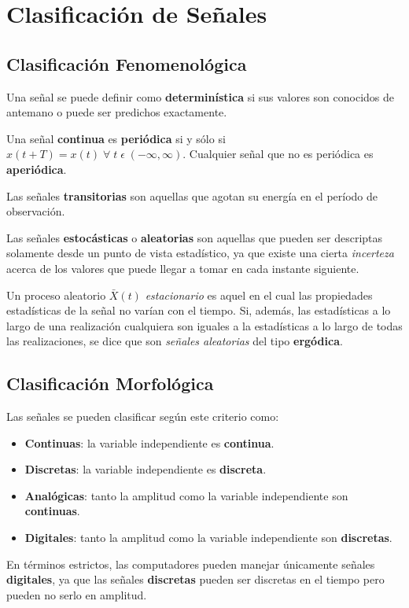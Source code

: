 \documentclass[10pt,a4paper]{book}
\begin{document}
\section{Clasificación de Señales}
\subsection{Clasificación Fenomenológica}

Una señal se puede definir como \textbf{determinística} si sus valores son conocidos de antemano o puede ser predichos exactamente.

Una señal \textbf{continua} es \textbf{periódica} si y sólo si $x(t+T)=x(t) \;\forall \; t\; \epsilon \; (-\infty, \infty)$. Cualquier señal que no es periódica es \textbf{aperiódica}. 

Las señales \textbf{transitorias} son aquellas que agotan su energía en el período de observación.

Las señales \textbf{estocásticas} o \textbf{aleatorias} son aquellas que pueden ser descriptas solamente desde un punto de vista estadístico, ya que existe una cierta \textit{incerteza} acerca de los valores que puede llegar a tomar en cada instante siguiente.

Un proceso aleatorio $\bar{X}(t)$ \textit{estacionario} es aquel en el cual las propiedades estadísticas de la señal no varían con el tiempo. Si, además, las estadísticas a lo largo de una realización cualquiera son iguales a la estadísticas a lo largo de todas las realizaciones, se dice que son \textit{señales aleatorias} del tipo \textbf{ergódica}.

\subsection{Clasificación Morfológica}
Las señales se pueden clasificar según este criterio como:
\begin{itemize}
\item \textbf{Continuas}: la variable independiente es \textbf{continua}.
\item \textbf{Discretas}: la variable independiente es \textbf{discreta}.
\item \textbf{Analógicas}: tanto la amplitud como la variable independiente son \textbf{continuas}.
\item \textbf{Digitales}: tanto la amplitud como la variable independiente son \textbf{discretas}.
\end{itemize}

En términos estrictos, las computadores pueden manejar únicamente señales \textbf{digitales}, ya que las señales \textbf{discretas} pueden ser discretas en el tiempo pero pueden no serlo en amplitud.
\end{document}
